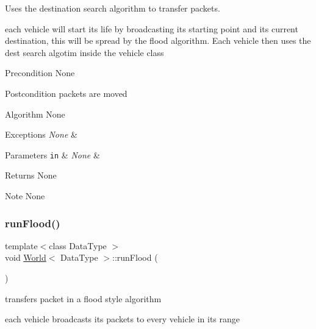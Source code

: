 Uses the destination search algorithm to transfer packets. 

each vehicle will start its life by broadcasting its starting point and its current destination, this will be spread by the flood algorithm. Each vehicle then uses the dest search algotim inside the vehicle class

\begin{DoxyPrecond}{Precondition}
None
\end{DoxyPrecond}
\begin{DoxyPostcond}{Postcondition}
packets are moved
\end{DoxyPostcond}
\begin{DoxyParagraph}{Algorithm None}

\end{DoxyParagraph}

\begin{DoxyExceptions}{Exceptions}
{\em None} & \\
\hline
\end{DoxyExceptions}

\begin{DoxyParams}[1]{Parameters}
\mbox{\tt in}  & {\em None} & \\
\hline
\end{DoxyParams}
\begin{DoxyReturn}{Returns}
None
\end{DoxyReturn}
\begin{DoxyNote}{Note}
None 
\end{DoxyNote}
\hypertarget{class_world_a7f6c1fdeb22dca9da9cb42bae186126e}{}\label{class_world_a7f6c1fdeb22dca9da9cb42bae186126e} 
\subsubsection{\texorpdfstring{run\+Flood()}{runFlood()}}
{\footnotesize\ttfamily template$<$class Data\+Type $>$ \\
void \hyperlink{class_world}{World}$<$ Data\+Type $>$\+::run\+Flood (\begin{DoxyParamCaption}{ }\end{DoxyParamCaption})\hspace{0.3cm}{\ttfamily [private]}}



transfers packet in a flood style algorithm 

each vehicle broadcasts its packets to every vehicle in its range

